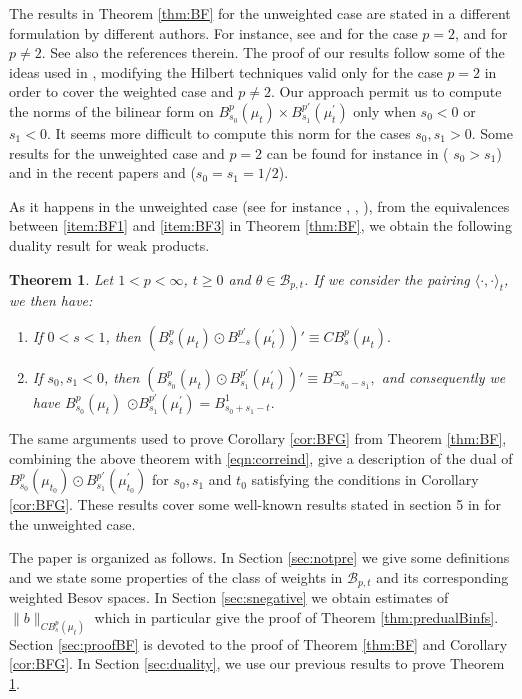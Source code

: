 \documentclass[12pt,twoside,leqno,final]{amsart}
\theoremstyle{plain}
\newtheorem{thm}{Theorem}[section]
\begin{document}
The results in Theorem \ref{thm:BF} for the unweighted case are stated in a different 
 formulation by different authors. For instance, see  \cite{Ro-Wu} and \cite{Wu} for the case 
 $p=2$, and \cite{Bla-Pau} for $p\ne 2$. See also the references therein.
The proof of our results follow some of the ideas used in \cite{Wu}, 
modifying the Hilbert techniques valid only for the case $p=2$ in order to cover 
 the weighted case and $p\ne 2$.
Our approach permit us to compute the norms of the 
  bilinear form   on  $B^p_{s_0}(\mu_t)\times B^{p'}_{s_1}(\mu^\prime_t)$ only when $s_0<0$ or $s_1<0$.  
 It seems more difficult to compute  this norm for the cases $s_0,s_1>0$. 
 Some results for the unweighted case and $p=2$ can be found for 
 instance in \cite{Wu} ( $s_0>s_1$) and in the recent papers 
  \cite{Ar-Ro-Saw-W1} and \cite{Ca-Or2} ($s_0=s_1=1/2$).

 As it happens in the unweighted case (see for instance \cite{Ro-Wu}, \cite{Co-Ve},  \cite{Ar-Ro-Saw-W2}), from the equivalences between \eqref{item:BF1} and 
\eqref{item:BF3} in Theorem \ref{thm:BF}, we obtain the following duality result for weak products.

\begin{thm} \label{thm:predualCBps}
Let $1<p<\infty$,  $t\ge 0$ and $\theta\in {{\mathcal B}}_{p,t}$. 
If we consider the pairing $\langle\cdot,\cdot\rangle_t$, we then have:

\begin{enumerate}
\item If $0<s<1$, then 
$
(B^p_s(\mu_t)\odot B^{p'}_{-s}(\mu^\prime_t))'\equiv CB^p_s(\mu_t).
$
	\item If $s_0,s_1<0$, then 
$
\left(B^p_{s_0}(\mu_t)\odot B^{p'}_{s_1}(\mu^\prime_t)\right)'\equiv B^\infty_{-s_0-s_1},
$
 and consequently we have 
$
B^p_{s_0}(\mu_t)$ $\odot B^{p'}_{s_1}(\mu^\prime_t)=B^1_{s_0+s_1-t}.
$
\end{enumerate}
\end{thm}

 
The same arguments used to prove Corollary \ref{cor:BFG} from Theorem \ref{thm:BF}, 
combining the above theorem with \eqref{eqn:correind}, give a description of the dual of 
$B^p_{s_0}(\mu_{t_0})\odot B^{p'}_{s_1}(\mu^\prime_{t_0})$ for $s_0,s_1$ and $t_0$ 
satisfying the conditions in Corollary \ref{cor:BFG}. 
These results cover some well-known results stated in section 5 in \cite{Co-Ve} 
for the unweighted case. 

 

The paper is organized as follows. 
In Section \ref{sec:notpre} we give some  definitions and  
we  state some properties of the class of weights in ${{\mathcal B}}_{p,t}$ and its corresponding  weighted Besov spaces.
In Section \ref{sec:snegative} we obtain estimates of $\|b\|_{CB^p_s(\mu_t)}$ 
which in particular give the proof of Theorem \ref{thm:predualBinfs}.
Section \ref{sec:proofBF} is devoted to the proof of Theorem \ref{thm:BF} and Corollary \ref{cor:BFG}. 
In Section \ref{sec:duality}, we use our previous results to prove Theorem \ref{thm:predualCBps}. 
\end{document}
